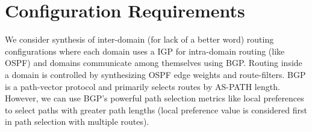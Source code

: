 \section{Configuration Requirements}
We consider synthesis of inter-domain 
(for lack of a better word) routing 
configurations where each domain uses a 
IGP for intra-domain routing (like 
OSPF) and domains communicate among 
themselves using BGP. 
Routing inside a domain is controlled 
by synthesizing OSPF edge weights and 
route-filters. BGP is a path-vector
protocol and primarily selects routes by 
AS-PATH length. However, we can 
use BGP's powerful path selection metrics 
like local preferences to select 
paths with greater path lengths (local
preference value is considered first in 
path selection with multiple routes). 